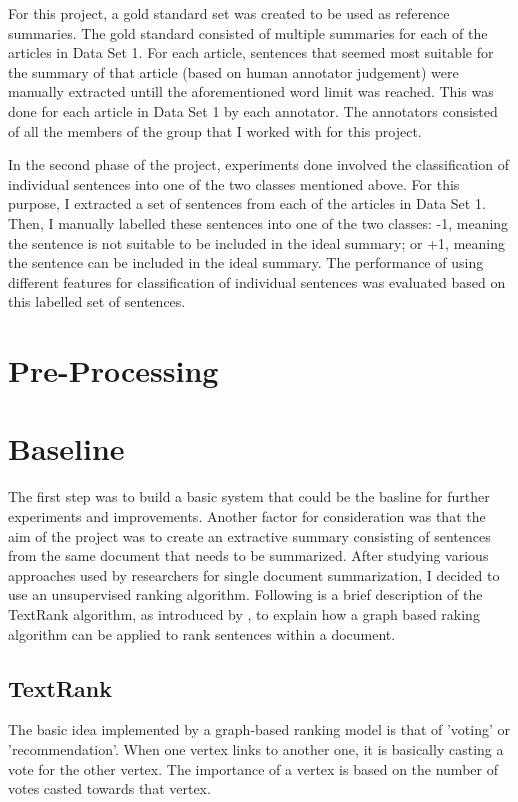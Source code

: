 For this project, a gold standard set was created to be used as reference summaries.
The gold standard consisted of multiple summaries for each of the articles in Data Set 1.
For each article, sentences that seemed most suitable for the summary of that article (based on human annotator judgement) were manually extracted untill the aforementioned word limit was reached.
This was done for each article in Data Set 1 by each annotator.
The annotators consisted of all the members of the group that I worked with for this project.

In the second phase of the project, experiments done involved the classification of individual sentences into one of the two classes mentioned above.
For this purpose, I extracted a set of sentences from each of the articles in Data Set 1.
Then, I manually labelled these sentences into one of the two classes: -1, meaning the sentence is not suitable to be included in the ideal summary; or +1, meaning the sentence can be included in the ideal summary.
The performance of using different features for classification of individual sentences was evaluated based on this labelled set of sentences.

\section{Pre-Processing}

\section{Baseline}
The first step was to build a basic system that could be the basline for further experiments and improvements.
Another factor for consideration was that the aim of the project was to create an extractive summary consisting of sentences from the same document that needs to be summarized.
After studying various approaches used by researchers for single document summarization, I decided to use an unsupervised ranking algorithm.
Following is a brief description of the TextRank algorithm, as introduced by \citep{Mihalcea et. al.[]}, to explain how a graph based raking algorithm can be applied to rank sentences within a document.

\subsection{TextRank}
The basic idea implemented by a graph-based ranking model is that of 'voting' or 'recommendation'.
When one vertex links to another one, it is basically casting a vote for the other vertex.
The importance of a vertex is based on the number of votes casted towards that vertex. 

